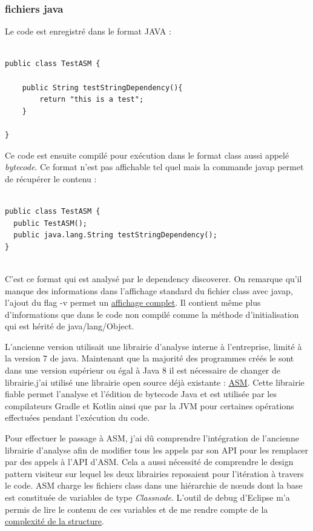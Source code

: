 \documentclass[french,a4paper,12pt]{report}
\begin{document}
\bigskip

\subsubsection{fichiers java}

Le code est enregistré dans le format JAVA :

\begin{lstlisting}

public class TestASM {
	
	public String testStringDependency(){
		return "this is a test";
	}
	
}

\end{lstlisting}

Ce code est ensuite compilé pour exécution dans le format class aussi appelé \textit{bytecode}. Ce format n'est pas affichable tel quel mais la commande javap permet de récupérer le contenu :

\begin{lstlisting}

public class TestASM {
  public TestASM();
  public java.lang.String testStringDependency();
}


\end{lstlisting}

C'est ce format qui est analysé par le dependency discoverer. On remarque qu'il manque des informations dans l'affichage standard du fichier class avec javap, l'ajout du flag -v permet un \hyperref[javapVtestASM]{affichage complet}. Il contient même plus d'informations que dans le code non compilé comme la méthode d'initialisation qui est hérité de java/lang/Object.

\bigskip

L'ancienne version utilisait une librairie d'analyse interne à l'entreprise, limité à la version 7 de java. Maintenant que la majorité des programmes créés le sont dans une version supérieur ou égal à Java 8 il est nécessaire  de changer de librairie.j'ai utilisé une librairie open source déjà existante : \href{https://asm.ow2.io/}{ASM}. Cette librairie fiable permet l'analyse et l'édition de bytecode Java et est utilisée par les compilateurs Gradle et Kotlin ainsi que par la JVM pour certaines opérations effectuées pendant l’exécution du code.

Pour effectuer le passage à ASM, j'ai dû comprendre l'intégration de l'ancienne librairie d'analyse afin de modifier tous les appels par son API pour les remplacer par des appels à l'API d'ASM. Cela a aussi nécessité de comprendre le design pattern visiteur sur lequel les deux librairies reposaient pour l'itération à travers le code. ASM charge les fichiers class dans une hiérarchie de nœuds dont la base est constituée de variables de type \textit{Classnode}. L'outil de debug d'Eclipse m'a permis de lire le contenu de ces variables et de me rendre compte de la \hyperref[ClassNode]{complexité de la structure}.
\end{document}
